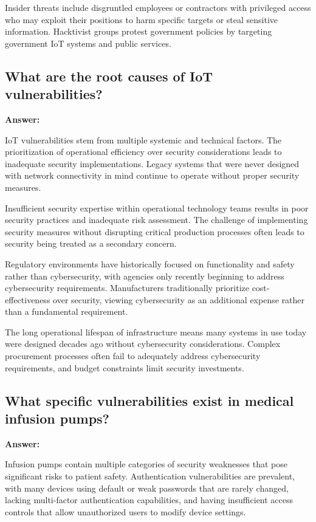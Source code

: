 \documentclass[12pt,a4paper]{article}
\begin{document}
Insider threats include disgruntled employees or contractors with privileged access who may exploit their positions to harm specific targets or steal sensitive information. Hacktivist groups protest government policies by targeting government IoT systems and public services.

\subsection{What are the root causes of IoT vulnerabilities?}

\textbf{Answer:}

IoT vulnerabilities stem from multiple systemic and technical factors. The prioritization of operational efficiency over security considerations leads to inadequate security implementations. Legacy systems that were never designed with network connectivity in mind continue to operate without proper security measures.

Insufficient security expertise within operational technology teams results in poor security practices and inadequate risk assessment. The challenge of implementing security measures without disrupting critical production processes often leads to security being treated as a secondary concern.

Regulatory environments have historically focused on functionality and safety rather than cybersecurity, with agencies only recently beginning to address cybersecurity requirements. Manufacturers traditionally prioritize cost-effectiveness over security, viewing cybersecurity as an additional expense rather than a fundamental requirement.

The long operational lifespan of infrastructure means many systems in use today were designed decades ago without cybersecurity considerations. Complex procurement processes often fail to adequately address cybersecurity requirements, and budget constraints limit security investments.

\subsection{What specific vulnerabilities exist in medical infusion pumps?}

\textbf{Answer:}

Infusion pumps contain multiple categories of security weaknesses that pose significant risks to patient safety. Authentication vulnerabilities are prevalent, with many devices using default or weak passwords that are rarely changed, lacking multi-factor authentication capabilities, and having insufficient access controls that allow unauthorized users to modify device settings.
\end{document}
